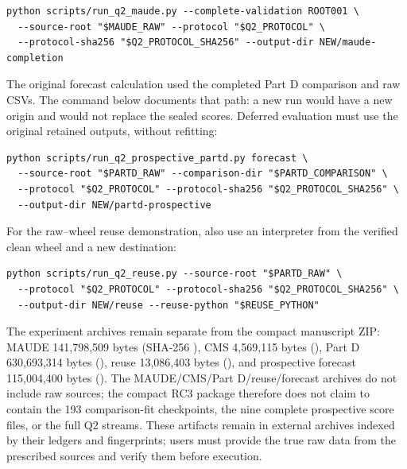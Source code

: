 \begin{Verbatim}[fontsize=\footnotesize]
python scripts/run_q2_maude.py --complete-validation ROOT001 \
  --source-root "$MAUDE_RAW" --protocol "$Q2_PROTOCOL" \
  --protocol-sha256 "$Q2_PROTOCOL_SHA256" --output-dir NEW/maude-completion
\end{Verbatim}

The original forecast calculation used the completed Part D comparison and raw CSVs. The command below documents that path: a new run would have a new origin and would not replace the sealed scores. Deferred evaluation must use the original retained outputs, without refitting:

\begin{Verbatim}[fontsize=\footnotesize]
python scripts/run_q2_prospective_partd.py forecast \
  --source-root "$PARTD_RAW" --comparison-dir "$PARTD_COMPARISON" \
  --protocol "$Q2_PROTOCOL" --protocol-sha256 "$Q2_PROTOCOL_SHA256" \
  --output-dir NEW/partd-prospective
\end{Verbatim}
For the raw--wheel reuse demonstration, also use an interpreter from the verified clean wheel and a new destination:

\begin{Verbatim}[fontsize=\footnotesize]
python scripts/run_q2_reuse.py --source-root "$PARTD_RAW" \
  --protocol "$Q2_PROTOCOL" --protocol-sha256 "$Q2_PROTOCOL_SHA256" \
  --output-dir NEW/reuse --reuse-python "$REUSE_PYTHON"
\end{Verbatim}

The experiment archives remain separate from the compact manuscript ZIP: MAUDE 141,798,509 bytes (SHA-256 ), CMS 4,569,115 bytes (), Part D 630,693,314 bytes (), reuse 13,086,403 bytes (), and prospective forecast 115,004,400 bytes (). The MAUDE/CMS/Part D/reuse/forecast archives do not include raw sources; the compact RC3 package therefore does not claim to contain the 193 comparison-fit checkpoints, the nine complete prospective score files, or the full Q2 streams. These artifacts remain in external archives indexed by their ledgers and fingerprints; users must provide the true raw data from the prescribed sources and verify them before execution.

